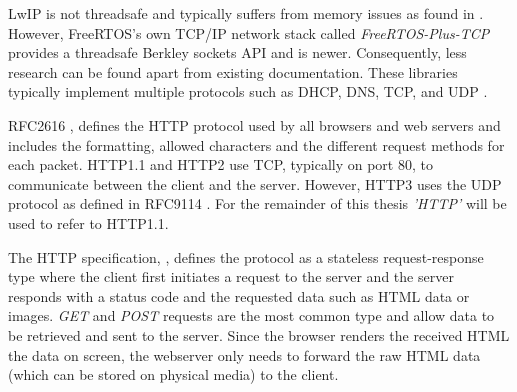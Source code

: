 LwIP is not threadsafe and typically suffers from memory issues as found in \cite{OptimCortexLwIP}. However, FreeRTOS's own TCP/IP network stack called \textit{FreeRTOS-Plus-TCP} provides a threadsafe Berkley sockets API and is newer. Consequently, less research can be found apart from existing documentation. These libraries typically implement multiple protocols such as DHCP, DNS, TCP, and UDP \cite{FreeRTOSTCP}.

RFC2616 \cite{rfc2616}, defines the HTTP protocol used by all browsers and web servers and includes the formatting, allowed characters and the different request methods for each packet. HTTP1.1 and HTTP2 use TCP, typically on port 80, to communicate between the client and the server. However, HTTP3 uses the UDP protocol as defined in RFC9114 \cite{rfc9114}. For the remainder of this thesis \textit{'HTTP'} will be used to refer to HTTP1.1.

The HTTP specification, \cite{rfc2616}, defines the protocol as a stateless request-response type where the client first initiates a request to the server and the server responds with a status code and the requested data such as HTML data or images. \textit{GET} and \textit{POST} requests are the most common type and allow data to be retrieved and sent to the server. Since the browser renders the received HTML the data on screen, the webserver only needs to forward the raw HTML data (which can be stored on physical media) to the client.